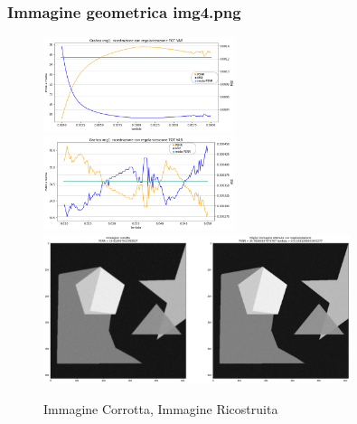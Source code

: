 {\color{rred}\subsubsection{Immagine geometrica img4.png}}
\begin{figure}[H]{}
    \centering
    \includegraphics[width=0.5\textwidth]{IMMAGINI_RELAZIONE/grafico4TOTVAR_riserva.png}%
    \includegraphics[width=0.5\textwidth]{IMMAGINI_RELAZIONE/proseguimentoGraficoTOTVAR4.png}
    \includegraphics[width=0.8\textwidth]{IMMAGINI_RELAZIONE/ricostruzione4TOTVAR.png}
    \caption{Immagine Corrotta, Immagine Ricostruita}
\end{figure}

